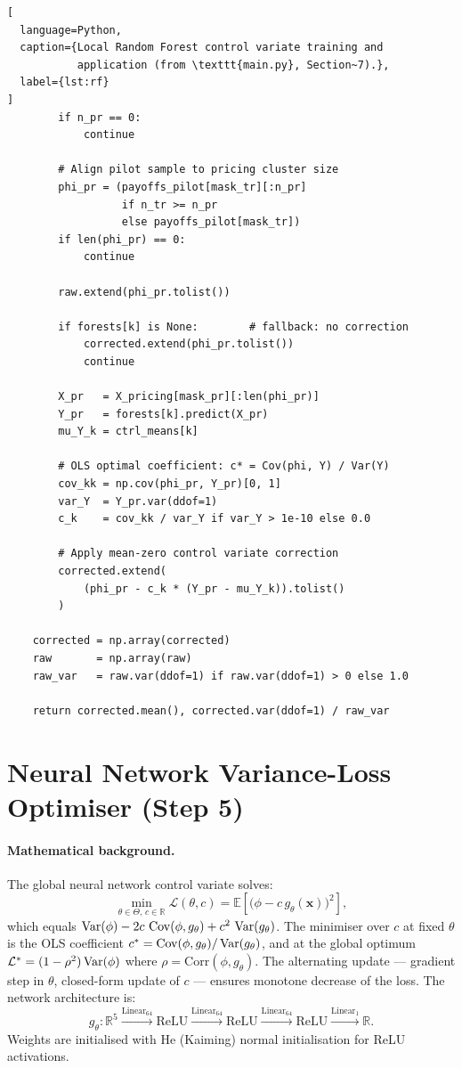 \begin{lstlisting}[
  language=Python,
  caption={Local Random Forest control variate training and
           application (from \texttt{main.py}, Section~7).},
  label={lst:rf}
]
        if n_pr == 0:
            continue

        # Align pilot sample to pricing cluster size
        phi_pr = (payoffs_pilot[mask_tr][:n_pr]
                  if n_tr >= n_pr
                  else payoffs_pilot[mask_tr])
        if len(phi_pr) == 0:
            continue

        raw.extend(phi_pr.tolist())

        if forests[k] is None:        # fallback: no correction
            corrected.extend(phi_pr.tolist())
            continue

        X_pr   = X_pricing[mask_pr][:len(phi_pr)]
        Y_pr   = forests[k].predict(X_pr)
        mu_Y_k = ctrl_means[k]

        # OLS optimal coefficient: c* = Cov(phi, Y) / Var(Y)
        cov_kk = np.cov(phi_pr, Y_pr)[0, 1]
        var_Y  = Y_pr.var(ddof=1)
        c_k    = cov_kk / var_Y if var_Y > 1e-10 else 0.0

        # Apply mean-zero control variate correction
        corrected.extend(
            (phi_pr - c_k * (Y_pr - mu_Y_k)).tolist()
        )

    corrected = np.array(corrected)
    raw       = np.array(raw)
    raw_var   = raw.var(ddof=1) if raw.var(ddof=1) > 0 else 1.0

    return corrected.mean(), corrected.var(ddof=1) / raw_var
\end{lstlisting}

\section{Neural Network Variance-Loss Optimiser (Step 5)}
\label{app:code-nn}

\paragraph{Mathematical background.}
The global neural network control variate solves:
\[
  \min_{\theta \in \Theta,\, c \in \mathbb{R}}
  \mathcal{L}(\theta, c)
  = \mathbb{E}\!\left[
      \bigl(\phi - c\,g_\theta(\mathbf{x})\bigr)^2
    \right],
\]
which equals $\operatorname{Var}(\phi) - 2c\,\operatorname{Cov}(\phi, g_\theta) + c^2\,\operatorname{Var}(g_\theta)$.
The minimiser over $c$ at fixed $\theta$ is the OLS coefficient
$c^* = \operatorname{Cov}(\phi, g_\theta)/\operatorname{Var}(g_\theta)$, and at the global optimum
$\mathcal{L}^* = (1 - \rho^2)\operatorname{Var}(\phi)$ where $\rho = \mathrm{Corr}(\phi, g_\theta)$.
The alternating update --- gradient step in $\theta$, closed-form update
of $c$ --- ensures monotone decrease of the loss.  The network
architecture is:
\[
  g_\theta : \mathbb{R}^5
  \xrightarrow{\text{Linear}_{64}} \text{ReLU}
  \xrightarrow{\text{Linear}_{64}} \text{ReLU}
  \xrightarrow{\text{Linear}_{64}} \text{ReLU}
  \xrightarrow{\text{Linear}_{1}} \mathbb{R}.
\]
Weights are initialised with He (Kaiming) normal initialisation
for ReLU activations.

